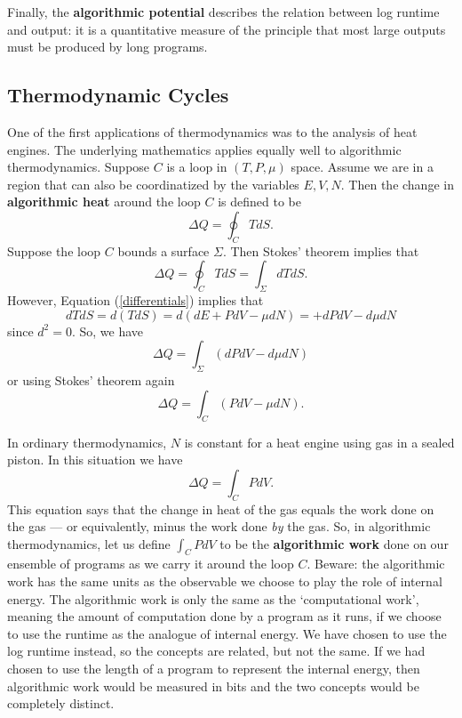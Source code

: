 \documentclass[12pt,twoside,openright]{report}
\begin{document}
Finally, the \textbf{algorithmic potential} describes the relation between log runtime and output: it is a quantitative measure of the principle that most large outputs must be produced by long programs.

\subsection{Thermodynamic Cycles} \label{cycles}

One of the first applications of thermodynamics was to the analysis of heat engines.  The underlying mathematics applies equally well to algorithmic thermodynamics.  Suppose $C$ is a loop in $(T,P,\mu)$ 
space.  Assume we are in a region that can also be coordinatized by the variables $E,V,N$.  Then the change in {\bf algorithmic heat} 
around the loop $C$ is defined to be
\[        \Delta Q = \oint_C T dS  .\]
Suppose the loop $C$ bounds a surface $\Sigma$.  Then Stokes' theorem implies that
\[        \Delta Q = \oint_C T dS  = \int_{\Sigma} dT dS . \]
However, Equation (\ref{differentials}) implies that
\[    dT dS = d(T dS) = d(dE + P dV - \mu dN) = + dP dV - d\mu dN \]
since $d^2 = 0$.  So, we have
\[      \Delta Q = \int_{\Sigma} (dP dV - d\mu dN)  \]
or using Stokes' theorem again
\begin{equation}
\label{loop}
      \Delta Q = \int_C (P dV - \mu dN). 
\end{equation}

In ordinary thermodynamics, $N$ is constant for a heat engine using gas in a sealed piston.  In this situation we have
\[
      \Delta Q = \int_C P dV  .
\]
This equation says that the change in heat of the gas equals the work done on the gas --- or equivalently, minus the work done \emph{by} the gas.  So, in algorithmic thermodynamics, let us define $\int_C P dV$
to be the {\bf algorithmic work} done on our ensemble of programs as we carry it around the loop $C$.  Beware: the algorithmic work has the same units as the observable we choose to play the role of internal energy.  The algorithmic work is only the same as the `computational work', meaning the amount of computation done by a program as it runs, if we choose to use the runtime as the analogue of internal energy. We have chosen to use the log runtime instead, so the concepts are related, but not the same.  If we had chosen to use the length of a program to represent the internal energy, then algorithmic work would be measured in bits and the two concepts would be completely distinct.
\end{document}
